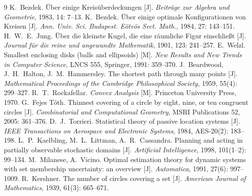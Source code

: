 \documentclass[withoutpreface,bwprint]{cumcmthesis}
\begin{document}
\begin{thebibliography}{9}
   K.~Bezdek.
  \newblock \"{U}ber einige Kreis\"{u}berdeckungen [J].
  \newblock \emph{Beitr\"{a}ge zur Algebra und Geometrie}, 1983, 14: 7--13.
   K.~Bezdek.
  \newblock \"{U}ber einige optimale Konfigurationen von Kreisen [J].
  \newblock \emph{Ann. Univ. Sci. Budapest. E\"{o}tv\"{o}s Sect. Math.}, 1984, 27: 143--151.
   H.~W.~E.~Jung.
  \newblock \"{U}ber die kleinste Kugel, die eine r\"{a}umliche Figur einschlie{\ss}t [J].
  \newblock \emph{Journal f\"{u}r die reine und angewandte Mathematik}, 1901, 123: 241--257.
   E.~Welzl.
  \newblock Smallest enclosing disks (balls and ellipsoids) [M].
  \newblock \emph{New Results and New Trends in Computer Science}, LNCS 555, Springer, 1991: 359--370.
   J.~Beardwood, J.~H.~Halton, J.~M.~Hammersley.
  \newblock The shortest path through many points [J].
  \newblock \emph{Mathematical Proceedings of the Cambridge Philosophical Society}, 1959, 55(4): 299--327.
   R.~T.~Rockafellar.
  \newblock \emph{Convex Analysis} [M].
  \newblock Princeton University Press, 1970.
   G.~Fejes T\'{o}th.
  \newblock Thinnest covering of a circle by eight, nine, or ten congruent circles [J].
  \newblock \emph{Combinatorial and Computational Geometry}, MSRI Publications 52, 2005: 361--376.
   D.~J.~Torrieri.
  \newblock Statistical theory of passive location systems [J].
  \newblock \emph{IEEE Transactions on Aerospace and Electronic Systems}, 1984, AES-20(2): 183--198.
   L.~P.~Kaelbling, M.~L.~Littman, A.~R.~Cassandra.
  \newblock Planning and acting in partially observable stochastic domains [J].
  \newblock \emph{Artificial Intelligence}, 1998, 101(1--2): 99--134.
   M.~Milanese, A.~Vicino.
  \newblock Optimal estimation theory for dynamic systems with set membership uncertainty: an overview [J].
  \newblock \emph{Automatica}, 1991, 27(6): 997--1009.
   R.~Kershner.
  \newblock The number of circles covering a set [J].
  \newblock \emph{American Journal of Mathematics}, 1939, 61(3): 665--671.
\end{thebibliography}

\newpage

\end{document}
